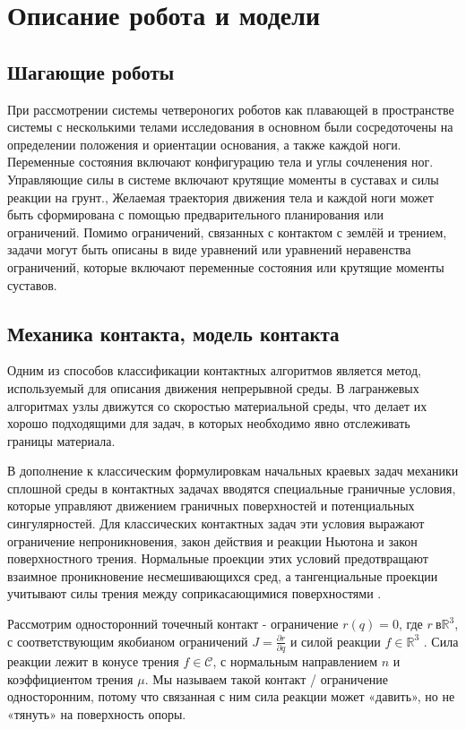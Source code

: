\chapter{Описание робота и модели}\label{ch:ch2}
\section{Шагающие роботы}\label{sec:ch2/sec1}
При рассмотрении системы четвероногих роботов как плавающей в пространстве системы с несколькими телами исследования в основном были сосредоточены на определении положения и ориентации основания, а также каждой ноги. Переменные состояния включают конфигурацию тела и углы сочленения ног. Управляющие силы в системе включают крутящие моменты в суставах и силы реакции на грунт.\cite{henze2016}, \cite{farshidian2017robust} Желаемая траектория движения тела и каждой ноги может быть сформирована с помощью предварительного планирования или ограничений. Помимо ограничений, связанных с контактом с землёй и трением,\cite{henze2017multi} задачи могут быть описаны в виде уравнений или уравнений неравенства ограничений, которые включают переменные состояния или крутящие моменты суставов. 

\section{Механика контакта, модель контакта}\label{sec:ch2/sect2}
Одним из способов классификации контактных алгоритмов является метод, используемый для описания движения непрерывной среды. В лагранжевых алгоритмах узлы движутся со скоростью материальной среды, что делает их хорошо подходящими для задач, в которых необходимо явно отслеживать границы материала. 

В дополнение к классическим формулировкам начальных краевых задач механики сплошной среды в контактных задачах вводятся специальные граничные условия, которые управляют движением граничных поверхностей и потенциальных сингулярностей. Для классических контактных задач эти условия выражают ограничение непроникновения, закон действия и реакции Ньютона и закон поверхностного трения. Нормальные проекции этих условий предотвращают взаимное проникновение несмешивающихся сред, а тангенциальные проекции учитывают силы трения между соприкасающимися поверхностями \cite{Shamim2024}.

Рассмотрим односторонний точечный контакт - ограничение ${r}({q}) = 0$, где ${r} \ в \mathbb{R}^3$, с соответствующим якобианом ограничений ${J} = \frac{\partial {r}}{\partial {q}}$ и силой реакции ${f} \in \mathbb{R}^3$ \cite{Posa2014}.
%
Сила реакции лежит в конусе трения ${f} \in \mathcal{C}$, с нормальным направлением ${n}$ и коэффициентом трения $\mu$.
%
Мы называем такой контакт / ограничение односторонним, потому что связанная с ним сила реакции может «давить», но не «тянуть» на поверхность опоры.

